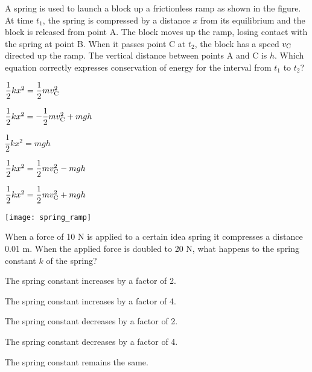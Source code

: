\documentclass[11pt]{article}
\begin{document}
\begin{enumerate}
\begin{minipage}[t]{\lw}
\begin{minipage}[t]{.6\lw}
\item A spring is used to launch a block up a frictionless ramp as shown in the figure. At time $t_1$, the spring is compressed by a distance $x$ from its equilibrium and the block is released from point A. The block moves up the ramp, losing contact with the spring at point B. When it passes point C at $t_2$, the block has a speed $v_{\rm C}$ directed up the ramp. The vertical distance between points A and C is $h$. Which equation correctly expresses conservation of energy for the interval from $t_1$ to $t_2$?
\begin{choices}
\item $\dfrac{1}{2}kx^2=\dfrac{1}{2}mv_{\rm C}^2$
\item $\dfrac{1}{2}kx^2=-\dfrac{1}{2}mv_{\rm C}^2+mgh$
\item $\dfrac{1}{2}kx^2=mgh$
\item $\dfrac{1}{2}kx^2=\dfrac{1}{2}mv_{\rm C}^2-mgh$
\item $\dfrac{1}{2}kx^2=\dfrac{1}{2}mv_{\rm C}^2+mgh$
\end{choices}
\end{minipage}\hfill
\begin{minipage}[t]{.35\lw}
\vspace{0in}
\flushright
\texttt{[image: spring\_ramp]}
\end{minipage}
\end{minipage}

\begin{minipage}[t]{\lw}
\item When a force of 10 N is applied to a certain idea spring it compresses a distance 0.01 m. When the applied force is doubled to 20 N, what happens to the spring constant $k$ of the spring?
\begin{choices}
\item The spring constant increases by a factor of 2.
\item The spring constant increases by a factor of 4.
\item The spring constant decreases by a factor of 2.
\item The spring constant decreases by a factor of 4.
\item The spring constant remains the same.
\end{choices}
\end{minipage}


\end{enumerate}
\end{document}
